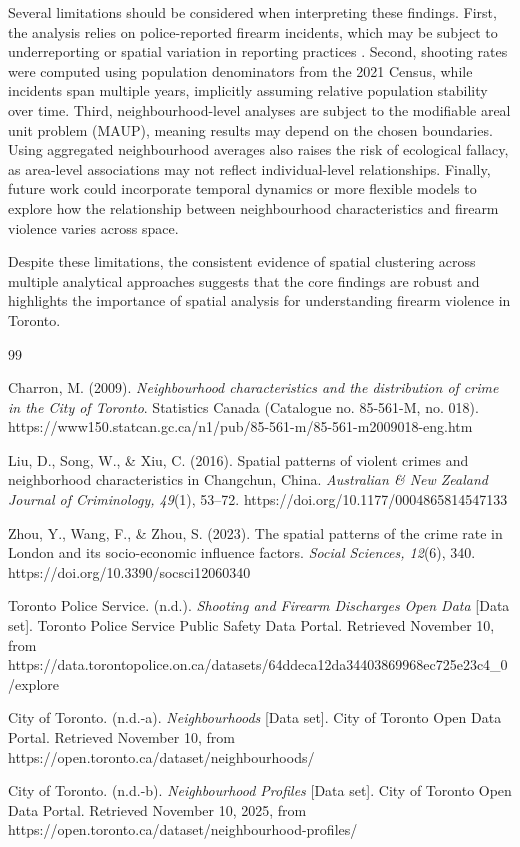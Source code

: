 \documentclass{article}
\begin{document}
\noindent Several limitations should be considered when interpreting these findings. First, the analysis relies on police-reported firearm incidents, which may be subject to underreporting or spatial variation in reporting practices \citep{charron2009toronto}. Second, shooting rates were computed using population denominators from the 2021 Census, while incidents span multiple years, implicitly assuming relative population stability over time. Third, neighbourhood-level analyses are subject to the modifiable areal unit problem (MAUP), meaning results may depend on the chosen boundaries. Using aggregated neighbourhood averages also raises the risk of ecological fallacy, as area-level associations may not reflect individual-level relationships. Finally, future work could incorporate temporal dynamics or more flexible models to explore how the relationship between neighbourhood characteristics and firearm violence varies across space.

\noindent Despite these limitations, the consistent evidence of spatial clustering across multiple analytical approaches suggests that the core findings are robust and highlights the importance of spatial analysis for understanding firearm violence in Toronto.

\begin{thebibliography}{99}

Charron, M. (2009).
\textit{Neighbourhood characteristics and the distribution of crime in the City of Toronto}.
Statistics Canada (Catalogue no. 85-561-M, no. 018).
https://www150.statcan.gc.ca/n1/pub/85-561-m/85-561-m2009018-eng.htm


Liu, D., Song, W., \& Xiu, C. (2016).
Spatial patterns of violent crimes and neighborhood characteristics in Changchun, China.
\textit{Australian \& New Zealand Journal of Criminology, 49}(1), 53--72.
https://doi.org/10.1177/0004865814547133

Zhou, Y., Wang, F., \& Zhou, S. (2023).
The spatial patterns of the crime rate in London and its socio-economic influence factors.
\textit{Social Sciences, 12}(6), 340.
https://doi.org/10.3390/socsci12060340

Toronto Police Service. (n.d.).
\textit{Shooting and Firearm Discharges Open Data} [Data set].
Toronto Police Service Public Safety Data Portal.
Retrieved November 10, from https://data.torontopolice.on.ca/datasets/64ddeca12da34403869968ec725e23c4\_0/explore

City of Toronto. (n.d.-a).
\textit{Neighbourhoods} [Data set].
City of Toronto Open Data Portal.
Retrieved November 10, from https://open.toronto.ca/dataset/neighbourhoods/

City of Toronto. (n.d.-b).
\textit{Neighbourhood Profiles} [Data set].
City of Toronto Open Data Portal.
Retrieved November 10, 2025, from https://open.toronto.ca/dataset/neighbourhood-profiles/


\end{thebibliography}
\end{document}
